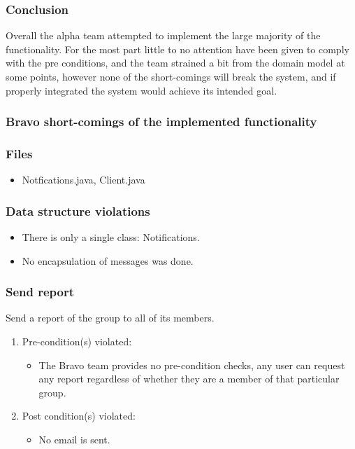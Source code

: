 \subsubsection*{Conclusion}
Overall the alpha team attempted to implement the large majority of the functionality. For the most part little to no attention 
have been given to comply with the pre conditions, and the team strained a bit from the domain model at some points, 
however none of the short-comings will break the system, and  if properly integrated the system would achieve its intended goal.

\subsubsection{Bravo short-comings of the implemented functionality}
\subsubsection*{Files}
\begin{itemize}
	\item Notfications.java, Client.java
\end{itemize}
\subsubsection*{Data structure violations}
	\begin{itemize}
		\item There is only a single class: Notifications.
		\item No encapsulation of messages was done.
	\end{itemize}
\subsubsection*{Send report}
Send a report of the group to all of its members.
\begin{enumerate}
	\item Pre-condition(s) violated:
	\begin{itemize}
		\item The Bravo team provides no pre-condition checks, any user can request any report regardless of whether they are a member of that particular group.
	\end{itemize}
	\item Post condition(s) violated:
	\begin{itemize}
		\item No email is sent.
	\end{itemize}
\end{enumerate}


